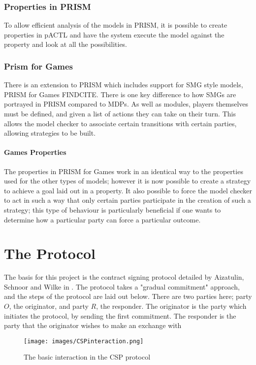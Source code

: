 \documentclass{l4proj}
\begin{document}
\subsection{Properties in PRISM}

To allow efficient analysis of the models in PRISM, it is possible to create properties in pACTL and have the system execute the model against the property and look at all the possibilities.


\subsection{Prism for Games}
There is an extension to PRISM which includes support for SMG style models, PRISM for Games {FINDCITE}.
There is one key difference to how SMGs are portrayed in PRISM compared to MDPs. As well as modules, players themselves must be defined, and given a list of actions they can take on their turn. This allows the model checker to associate certain transitions with certain parties, allowing strategies to be built.
\subsubsection{Games Properties}
The properties in PRISM for Games work in an identical way to the properties used for the other types of models; however it is now possible to create a strategy to achieve a goal laid out in a property. It also possible to force the model checker to act in such a way that only certain parties participate in the creation of such a strategy; this type of behaviour is particularly beneficial if one wants to determine how a particular party can force a particular outcome.


\chapter{The Protocol}
The basis for this project is the contract signing protocol detailed by Aizatulin, Schnoor and Wilke in \cite{ASW09}. The protocol takes a "gradual commitment" approach, and the steps of the protocol are laid out below. There are two parties here; party $O$, the originator, and party $R$, the responder. The originator is the party which initiates the protocol, by sending the first commitment. The responder is the party that the originator wishes to make an exchange with


\begin{figure}[ht!]
\centering
\texttt{[image: images/CSPinteraction.png]}
\caption{The basic interaction in the CSP protocol}
\label{csp}
\end{figure}
\end{document}
